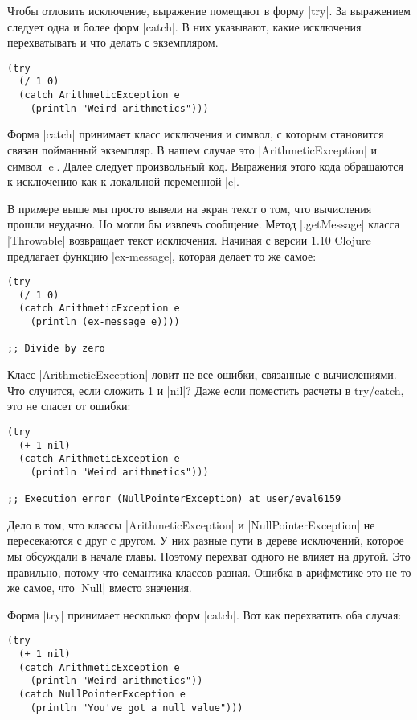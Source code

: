 Чтобы отловить исключение, выражение помещают в форму \spverb|try|. За выражением
следует одна и более форм \spverb|catch|. В них указывают, какие исключения
перехватывать и что делать с экземпляром.

\begin{verbatim}
(try
  (/ 1 0)
  (catch ArithmeticException e
    (println "Weird arithmetics")))
\end{verbatim}

Форма \spverb|catch| принимает класс исключения и символ, с которым становится связан
пойманный экземпляр. В нашем случае это \spverb|ArithmeticException| и символ
\spverb|e|. Далее следует произвольный код. Выражения этого кода обращаются к
исключению как к локальной переменной \spverb|e|.

В примере выше мы просто вывели на экран текст о том, что вычисления прошли
неудачно. Но могли бы извлечь сообщение. Метод \spverb|.getMessage| класса \spverb|Throwable|
возвращает текст исключения. Начиная с версии 1.10 Clojure предлагает функцию
\spverb|ex-message|, которая делает то же самое:

\begin{verbatim}
(try
  (/ 1 0)
  (catch ArithmeticException e
    (println (ex-message e))))

;; Divide by zero
\end{verbatim}

Класс \spverb|ArithmeticException| ловит не все ошибки, связанные с вычислениями. Что
случится, если сложить 1 и \spverb|nil|? Даже если поместить расчеты в try/catch, это
не спасет от ошибки:

\begin{verbatim}
(try
  (+ 1 nil)
  (catch ArithmeticException e
    (println "Weird arithmetics")))

;; Execution error (NullPointerException) at user/eval6159
\end{verbatim}

Дело в том, что классы \spverb|ArithmeticException| и \spverb|NullPointerException| не
пересекаются с друг с другом. У них разные пути в дереве исключений, которое мы
обсуждали в начале главы. Поэтому перехват одного не влияет на другой. Это
правильно, потому что семантика классов разная. Ошибка в арифметике это не то же
самое, что \spverb|Null| вместо значения.

Форма \spverb|try| принимает несколько форм \spverb|catch|. Вот как перехватить оба случая:

\begin{verbatim}
(try
  (+ 1 nil)
  (catch ArithmeticException e
    (println "Weird arithmetics"))
  (catch NullPointerException e
    (println "You've got a null value")))
\end{verbatim}

